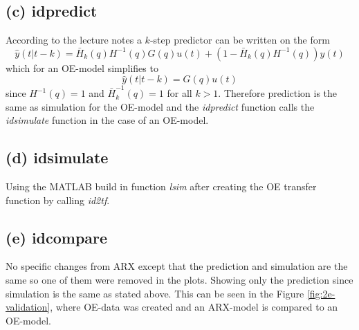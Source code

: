 \documentclass[]{article}
\begin{document}
\subsection{(c) idpredict}
According to the lecture notes a $k$-step predictor can be written on the form
\begin{equation}
	\label{eq:K-step Prediction}
	\hat{y}(t|t-k) = \bar{H}_k(q)H^{-1}(q)G(q)u(t) + (1-\bar{H}_k(q)H^{-1}(q))y(t)
\end{equation}
which for an OE-model simplifies to
\begin{equation}
	\label{eq:K-step Prediction OE}
	\hat{y}(t|t-k) = G(q)u(t)
\end{equation}
since $H^{-1}(q)=1$ and $\bar{H}_k^{-1}(q)=1$ for all $k > 1$. Therefore prediction is the same as simulation for the OE-model and the \emph{idpredict} function calls the \emph{idsimulate} function in the case of an OE-model.

\subsection{(d) idsimulate}
Using the MATLAB build in function \emph{lsim} after creating the OE transfer function by calling \emph{id2tf}.

\subsection{(e) idcompare}
No specific changes from ARX except that the prediction and simulation are the same so one of them were removed in the plots.
Showing only the prediction since simulation is the same as stated above. This can be seen in the Figure \ref{fig:2e-validation}, where OE-data was created and an ARX-model is compared to an OE-model.
\end{document}
